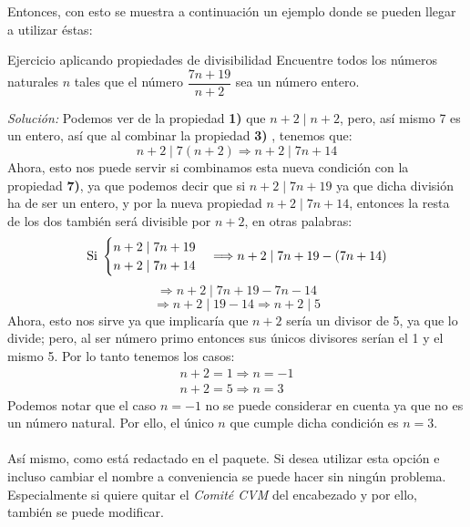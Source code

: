 \documentclass[letterpaper, 13pt]{article}
\begin{document}
\newpage 
Entonces, con esto se muestra a continuación un ejemplo donde se pueden llegar a utilizar éstas:
\begin{ejemplo}{Ejercicio aplicando propiedades de divisibilidad}{}
Encuentre todos los números naturales $n$ tales que el número $\dfrac{7n+19}{n+2}$ sea un número entero. 
\end{ejemplo} 
\textit{Solución:} Podemos ver de la propiedad \textbf{1) } que $n+2 \mid n+2$, pero, así mismo 7 es un entero, así que al combinar la propiedad \textbf{3) }, tenemos que: $$n+2 \mid 7(n+2) \Longrightarrow n+2 \mid 7n+14$$
Ahora, esto nos puede servir si combinamos esta nueva condición con la propiedad \textbf{7)}, ya que podemos decir que si $n+2 \mid 7n+19$ ya que dicha división ha de ser un entero, y por la nueva propiedad $ n+2 \mid 7n+14$, entonces la resta de los dos también será divisible por $n+2$, en otras palabras:
$$ \text{Si} \hspace*{0.1cm}\begin{cases}
	n+2 \mid 7n+19\\
	n+2 \mid 7n+14
\end{cases} \Longrightarrow n+2 \mid 7n+19-(7n+14)$$
$$ \Longrightarrow n+2 \mid 7n+19-7n-14$$
$$ \Longrightarrow n+2 \mid 19-14 \Longrightarrow n+2 \mid 5$$
Ahora, esto nos sirve ya que implicaría que $n+2$ sería un divisor de 5, ya que lo divide; pero, al ser número primo entonces sus únicos divisores serían el 1 y el mismo 5. Por lo tanto tenemos los casos:
\begin{align*}
	n+2=1 \Longrightarrow n=-1 \\ n+2=5 \Longrightarrow n=3
\end{align*}
Podemos notar que el caso $n=-1$ no se puede considerar en cuenta ya que no es un número natural. Por ello, el único $n$ que cumple dicha condición es $n=3$.
\\\\
Así mismo, como está redactado en el paquete. Si desea utilizar esta opción e incluso cambiar el nombre a conveniencia se puede hacer sin ningún problema. Especialmente si quiere quitar el \textit{Comité CVM} del encabezado y por ello, también se puede modificar.
\end{document}
